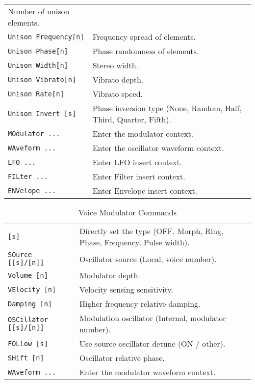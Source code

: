 \begin{table}[H]
\begin{tabular}{l l}
   Number of unison elements. \\
\texttt{Unison Frequency[n]} &
   Frequency spread of elements. \\
\texttt{Unison Phase[n]} &
   Phase randomness of elements. \\
\texttt{Unison Width[n]} &
   Stereo width. \\
\texttt{Unison Vibrato[n]} &
   Vibrato depth. \\
\texttt{Unison Rate[n]} &
   Vibrato speed. \\
\texttt{Unison Invert [s]} &
   Phase inversion type (None, Random, Half, Third, Quarter, Fifth). \\
\texttt{MOdulator ...} &
   Enter the modulator context. \\
\texttt{WAveform ...} &
   Enter the oscillator waveform context. \\
\texttt{LFO ...} &
   Enter LFO insert context.  \\
\texttt{FILter ...} &
   Enter Filter insert context.  \\
\texttt{ENVelope ...} &
   Enter Envelope insert context.   \\
      \end{tabular}
   \end{table}

   \begin{table}[H]
      \caption{Voice Modulator Commands}
      \label{table:yoshimi_part_addsynth_voice_modulator_commands}
      \begin{tabular}{l l}

\texttt{[s]} &
   Directly set the type (OFF, Morph, Ring, Phase, Frequency, Pulse width). \\
\texttt{SOurce [[s]/[n]]} &
   Oscillator source (Local, voice number). \\
\texttt{Volume [n]} &
   Modulator depth.  \\
\texttt{VElocity [n]} &
   Velocity sensing sensitivity. \\
\texttt{Damping [n]} &
   Higher frequency relative damping. \\
\texttt{OSCillator [[s]/[n]]} &
   Modulation oscillator (Internal, modulator number). \\
\texttt{FOLlow [s]} &
   Use source oscillator detune (ON / other). \\
\texttt{SHift [n]} &
   Oscillator relative phase. \\
\texttt{WAveform ...} &
   Enter the modulator waveform context. \\
      \end{tabular}
   \end{table}


